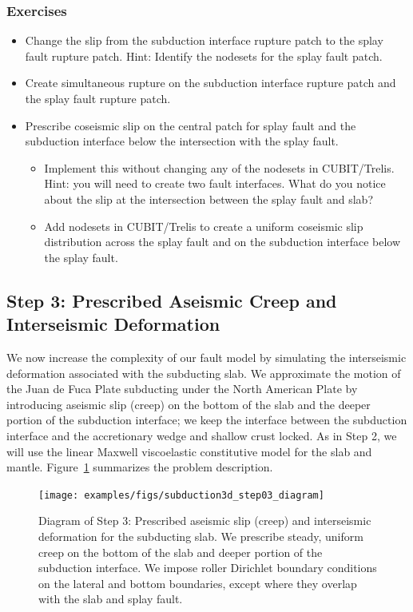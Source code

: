 \subsubsection{Exercises}

\begin{itemize}
\item Change the slip from the subduction interface rupture patch to
  the splay fault rupture patch. Hint: Identify the nodesets for the
  splay fault patch.
\item Create simultaneous rupture on the subduction interface rupture
  patch and the splay fault rupture patch.
\item Prescribe coseismic slip on the central patch for splay fault
  and the subduction interface below the intersection with the splay fault.
  \begin{itemize}
  \item Implement this without changing any of the nodesets in
    CUBIT/Trelis. Hint: you will need to create two fault
    interfaces. What do you notice about the slip at the intersection
    between the splay fault and slab?
  \item Add nodesets in CUBIT/Trelis to create a uniform coseismic
    slip distribution across the splay fault and on the subduction interface
    below the splay fault.
  \end{itemize}
\end{itemize}


\subsection{Step 3: Prescribed Aseismic Creep and Interseismic Deformation}
\label{sec:example:subduction:3d:step03}

We now increase the complexity of our fault model by simulating the
interseismic deformation associated with the subducting slab. We
approximate the motion of the Juan de Fuca Plate subducting under the
North American Plate by introducing aseismic slip (creep) on the
bottom of the slab and the deeper portion of the subduction interface;
we keep the interface between the subduction interface and the
accretionary wedge and shallow crust locked. As in Step 2, we will use
the linear Maxwell viscoelastic constitutive model for the slab and
mantle.  Figure~\ref{fig:example:subduction:3d:step03:diagram}
summarizes the problem description.

\begin{figure}[htbp]
  \texttt{[image: examples/figs/subduction3d\_step03\_diagram]}
  \caption{Diagram of Step 3: Prescribed aseismic slip (creep) and
    interseismic deformation for the subducting slab. We prescribe
    steady, uniform creep on the bottom of the slab and deeper portion
    of the subduction interface. We impose roller Dirichlet boundary
    conditions on the lateral and bottom boundaries, except where they
    overlap with the slab and splay fault.}
  \label{fig:example:subduction:3d:step03:diagram}
\end{figure}

